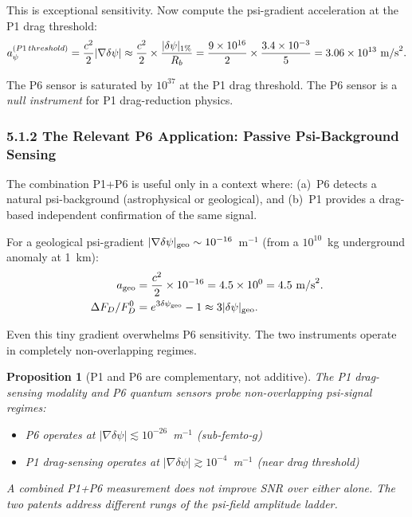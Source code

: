 \documentclass[11pt,twocolumn]{article}
\newcommand{\dpsi}{\delta\psi}
\newtheorem{proposition}{Proposition}
\begin{document}
This is exceptional sensitivity. Now compute the psi-gradient acceleration
at the P1 drag threshold:
\begin{equation}
a_{\psi}^{(P1\,threshold)}
= \frac{c^2}{2}|\nabla\dpsi|
\approx \frac{c^2}{2}\times\frac{|\dpsi|_{\rm 1\%}}{R_b}
= \frac{9\times10^{16}}{2}
  \times\frac{3.4\times10^{-3}}{5}
= 3.06\times10^{13}~\text{m/s}^2.
\label{eq:P1_threshold_accel}
\end{equation}

The P6 sensor is saturated by $10^{37}$ at the P1 drag threshold. The
P6 sensor is a \emph{null instrument} for P1 drag-reduction physics.

\subsubsection*{5.1.2 The Relevant P6 Application: Passive Psi-Background
Sensing}

The combination P1+P6 is useful only in a context where:
(a)~P6 detects a natural psi-background (astrophysical or geological), and
(b)~P1 provides a drag-based independent confirmation of the same signal.

For a geological psi-gradient $|\nabla\dpsi|_{\rm geo} \sim 10^{-16}$~m$^{-1}$
(from a $10^{10}$~kg underground anomaly at 1~km):
\begin{align}
a_{\rm geo} &= \frac{c^2}{2}\times10^{-16} = 4.5\times10^0 = 4.5~\text{m/s}^2. \\
\Delta F_D/F_D^0 &= e^{3\dpsi_{\rm geo}} - 1 \approx 3|\dpsi|_{\rm geo}.
\end{align}

Even this tiny gradient overwhelms P6 sensitivity. The two instruments
operate in completely non-overlapping regimes.

\begin{proposition}[P1 and P6 are complementary, not additive]
\label{prop:P1P6}
The P1 drag-sensing modality and P6 quantum sensors probe non-overlapping
psi-signal regimes:
\begin{itemize}[nosep]
\item P6 operates at $|\nabla\dpsi| \lesssim 10^{-26}$~m$^{-1}$ (sub-femto-$g$)
\item P1 drag-sensing operates at $|\nabla\dpsi| \gtrsim 10^{-4}$~m$^{-1}$
  (near drag threshold)
\end{itemize}
A combined P1+P6 measurement does not improve SNR over either alone. The
two patents address different rungs of the psi-field amplitude ladder.
\end{proposition}
\end{document}
